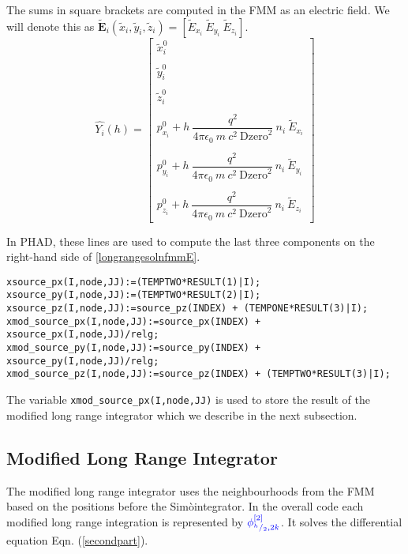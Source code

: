 \documentclass[oneside,12pt]{book}
\renewcommand{\vec}{\mathbf}
\newcommand{\Simo}{Sim\`{o}}
\begin{document}
The sums in square brackets are computed in the FMM as an electric field.  We will denote this as $\tilde{\vec{E}}_i(\tilde{x}_i, \tilde{y}_i, \tilde{z}_i)=[\tilde{E}_{x_i} \ \tilde{E}_{y_i} \ \tilde{E}_{z_i}]$. 
\begin{equation}
\hat{Y_i}(h)=\left[
\begin{array}{c}
\tilde{x}_i^0
\\
\\
\tilde{y}_i^0
\\
\\
\tilde{z}_i^0
\\
\\
p_{x_i}^0+h \ \dfrac{q^2}{4 \pi \epsilon_0 \ m \ c^2 \ \text{Dzero}^2} \ n_i \ \tilde{E}_{x_i}
\\
\\
p_{y_i}^0+h \ \dfrac{q^2}{4 \pi \epsilon_0 \ m \ c^2 \ \text{Dzero}^2} \ n_i \ \tilde{E}_{y_i}
\\
\\
p_{z_i}^0+h \ \dfrac{q^2}{4 \pi \epsilon_0 \ m \ c^2 \ \text{Dzero}^2} \ n_i \ \tilde{E}_{z_i}
\end{array}
\right]
\label{longrangesolnfmmE}
\end{equation}

In PHAD, these lines are used to compute the last three components on the right-hand side of \eqref{longrangesolnfmmE}.
\begin{lstlisting}
xsource_px(I,node,JJ):=(TEMPTWO*RESULT(1)|I);
xsource_py(I,node,JJ):=(TEMPTWO*RESULT(2)|I);
xsource_pz(I,node,JJ):=source_pz(INDEX) + (TEMPONE*RESULT(3)|I);
xmod_source_px(I,node,JJ):=source_px(INDEX) + xsource_px(I,node,JJ)/relg;
xmod_source_py(I,node,JJ):=source_py(INDEX) + xsource_py(I,node,JJ)/relg;
xmod_source_pz(I,node,JJ):=source_pz(INDEX) + (TEMPTWO*RESULT(3)|I);
\end{lstlisting}

The variable \texttt{xmod{\_}source{\_}px(I,node,JJ)} is used to store the result of the modified long range integrator which we describe in the next subsection.

\subsection{Modified Long Range Integrator}

The modified long range integrator uses the neighbourhoods from the FMM based on the positions before the \Simo integrator.  In the overall code each modified long range integration is represented by ${\color{blue}\phi^{[2]}_{^h\slash_2,2k}}$.  It solves the differential equation Eqn. (\ref{secondpart}).  
\end{document}
